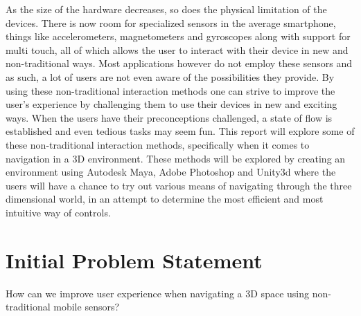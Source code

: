 As the size of the hardware decreases, so does the physical limitation of the devices. There is now room for specialized sensors in the average smartphone, things like accelerometers, magnetometers and gyroscopes along with support for multi touch, all of which allows the user to interact with their device in new and non-traditional ways.
Most applications however do not employ these sensors and as such, a lot of users are not even aware of the possibilities they provide.
By using these non-traditional interaction methods one can strive to improve the user's experience by challenging them to use their devices in new and exciting ways. When the users have their preconceptions challenged, a state of flow is established and even tedious tasks may seem fun.
This report will explore some of these non-traditional interaction methods, specifically when it comes to navigation in a 3D environment.
These methods will be explored by creating an environment using Autodesk Maya, Adobe Photoshop and Unity3d where the users will have a chance to try out various means of navigating through the three dimensional world, in an attempt to determine the most efficient and most intuitive way of controls.

\section{Initial Problem Statement}
How can we improve user experience when navigating a 3D space using non-traditional mobile sensors?